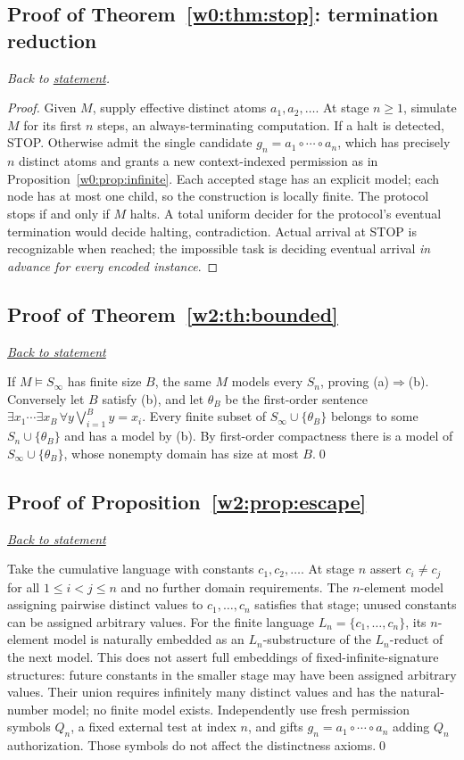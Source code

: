 \documentclass[11pt,letterpaper]{article}
\theoremstyle{definition}\newtheorem{definition}[theorem]{Definition}\newtheorem{example}[theorem]{Example}
\theoremstyle{remark}\newtheorem{remark}[theorem]{Remark}
\newcommand{\backlink}[1]{\noindent\hyperref[#1]{\textit{Back to statement}}\par\smallskip}
\begin{document}
\subsection{Proof of Theorem~\ref{w0:thm:stop}: termination reduction}\label{w0:pr:stop}
\textit{Back to \hyperref[w0:thm:stop]{statement}.}
\begin{proof}
Given $M$, supply effective distinct atoms $a_1,a_2,\ldots$. At stage $n\ge1$, simulate $M$ for its first $n$ steps, an always-terminating computation. If a halt is detected, STOP. Otherwise admit the single candidate $g_n=a_1\circ\cdots\circ a_n$, which has precisely $n$ distinct atoms and grants a new context-indexed permission as in Proposition~\ref{w0:prop:infinite}. Each accepted stage has an explicit model; each node has at most one child, so the construction is locally finite. The protocol stops if and only if $M$ halts. A total uniform decider for the protocol's eventual termination would decide halting, contradiction. Actual arrival at STOP is recognizable when reached; the impossible task is deciding eventual arrival \emph{in advance for every encoded instance}.
\end{proof}



\subsection{Proof of Theorem~\ref{w2:th:bounded}}\label{w2:pr:bounded}\backlink{w2:th:bounded}
If $M\models S_\infty$ has finite size $B$, the same $M$ models every $S_n$, proving (a)$\Rightarrow$(b). Conversely let $B$ satisfy (b), and let $\theta_B$ be the first-order sentence $\exists x_1\cdots\exists x_B\,\forall y\bigvee_{i=1}^B y=x_i$. Every finite subset of $S_\infty\cup\{\theta_B\}$ belongs to some $S_n\cup\{\theta_B\}$ and has a model by (b). By first-order compactness there is a model of $S_\infty\cup\{\theta_B\}$, whose nonempty domain has size at most $B$.\qed


\subsection{Proof of Proposition~\ref{w2:prop:escape}}\label{w2:pr:escape}\backlink{w2:prop:escape}
Take the cumulative language with constants $c_1,c_2,\dots$. At stage $n$ assert $c_i\ne c_j$ for all $1\le i<j\le n$ and no further domain requirements. The $n$-element model assigning pairwise distinct values to $c_1,\dots,c_n$ satisfies that stage; unused constants can be assigned arbitrary values. For the finite language $L_n=\{c_1,\dots,c_n\}$, its $n$-element model is naturally embedded as an $L_n$-substructure of the $L_n$-reduct of the next model. This does not assert full embeddings of fixed-infinite-signature structures: future constants in the smaller stage may have been assigned arbitrary values. Their union requires infinitely many distinct values and has the natural-number model; no finite model exists. Independently use fresh permission symbols $Q_n$, a fixed external test at index $n$, and gifts $g_n=a_1\circ\cdots\circ a_n$ adding $Q_n$ authorization. Those symbols do not affect the distinctness axioms.\qed
\end{document}
